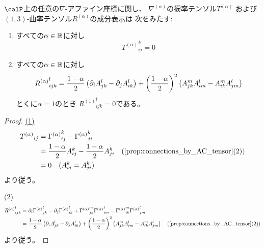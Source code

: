 \documentclass[report]{jlreq}
\begin{document}
\begin{proposition}[捩率と曲率のACテンソルによる表示]
    $\calP$上の任意の$\nabla$-アファイン座標に関し、
    $\nabla^{(\alpha)}$の捩率テンソル$T^{(\alpha)}$
    および$(1, 3)$-曲率テンソル$R^{(\alpha)}$の成分表示は
    次をみたす:
    \begin{enumerate}
        \item すべての$\alpha \in \mathbb{R}$に対し
            \begin{equation}
                {T^{(\alpha)}}_{ij}^k
                    = 0
            \end{equation}
        \item すべての$\alpha \in \mathbb{R}$に対し
            \begin{equation}
                {R^{(\alpha)}}_{ijk}^l
                    = \frac{1 - \alpha}{2} \left({
                        \partial_i A_{jk}^l
                        -
                        \partial_j A_{ik}^l
                    }\right)
                    + \left({\frac{1 - \alpha}{2}}\right)^2
                    \left({
                        A_{jk}^m A_{im}^l
                        -
                        A_{ik}^m A_{jm}^l
                    }\right)
            \end{equation}
            とくに$\alpha = 1$のとき
            ${R^{(1)}}_{ijk}^l = 0$である。
    \end{enumerate}
\end{proposition}

\begin{proof}
    \uline{(1)} \quad
    \begin{alignat}{1}
        {T^{(\alpha)}}_{ij}
            &=
                {\Gamma^{(\alpha)}}_{ij}^k
                - {\Gamma^{(\alpha)}}_{ji}^k
                \\
            &=
                \frac{1 - \alpha}{2} A_{ij}^k
                - \frac{1 - \alpha}{2} A_{ji}^k
                \quad
                (\cref{prop:connections_by_AC_tensor} (2))
                \\
            &=
                0
                \quad
                (\text{$A_{ij}^k = A_{ji}^k$})
    \end{alignat}
    より従う。

    \uline{(2)} \quad
    \begin{alignat}{1}
        {R^{(\alpha)}}_{ijk}^l
            &=
                \del_i {\Gamma^{(\alpha)}}_{jk}^l
                - \del_j {\Gamma^{(\alpha)}}_{ik}^l
                + {\Gamma^{(\alpha)}}_{jk}^m
                    {\Gamma^{(\alpha)}}_{im}^l
                - {\Gamma^{(\alpha)}}_{ik}^m
                    {\Gamma^{(\alpha)}}_{jm}^l
                \\
            &=
                \frac{1 - \alpha}{2}
                \myparen{
                    \del_i A_{jk}^l
                    - \del_j A_{ik}^l
                }
                + \myparen{\frac{1 - \alpha}{2}}^2
                \myparen{
                    A_{jk}^m A_{im}^l
                    - A_{ik}^m A_{jm}^l
                }
                \quad
                (\cref{prop:connections_by_AC_tensor} (2))
    \end{alignat}
    より従う。
\end{proof}
\end{document}
